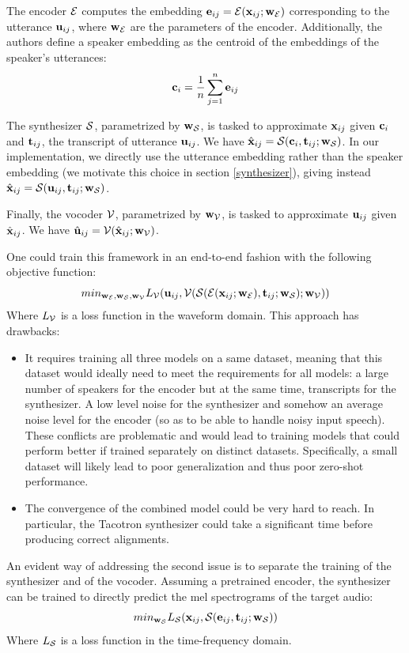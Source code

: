 \documentclass[a4paper, oneside, 12pt, english]{article}
\begin{document}
The encoder $\mathcal{E}$ computes the embedding $\mathbf{e}_{ij} = \mathcal{E}(\mathbf{x}_{ij}; \mathbf{w}_{\mathcal{E}})$ corresponding to the utterance $\mathbf{u}_{ij}$, where $\mathbf{w}_{\mathcal{E}}$ are the parameters of the encoder. Additionally, the authors define a speaker embedding as the centroid of the embeddings of the speaker's utterances:
\begin{equation}\label{speaker_embedding}
\mathbf{c}_i=\frac{1}{n}\sum_{j=1}^{n}\mathbf{e}_{ij}
\end{equation}

The synthesizer $\mathcal{S}$, parametrized by $\mathbf{w}_{\mathcal{S}}$, is tasked to approximate $\mathbf{x}_{ij}$ given $\mathbf{c}_i$ and $\mathbf{t}_{ij}$, the transcript of utterance $\mathbf{u}_{ij}$. We have $\hat{\mathbf{x}}_{ij} = \mathcal{S}(\mathbf{c}_i, \mathbf{t}_{ij}; \mathbf{w}_{\mathcal{S}})$. In our implementation, we directly use the utterance embedding rather than the speaker embedding (we motivate this choice in section \ref{synthesizer}), giving instead $\hat{\mathbf{x}}_{ij} = \mathcal{S}(\mathbf{u}_{ij}, \mathbf{t}_{ij}; \mathbf{w}_{\mathcal{S}})$.

Finally, the vocoder $\mathcal{V}$, parametrized by $\mathbf{w}_{\mathcal{V}}$, is tasked to approximate $\mathbf{u}_{ij}$ given $\hat{\mathbf{x}}_{ij}$. We have $\hat{\mathbf{u}}_{ij} = \mathcal{V}(\hat{\mathbf{x}}_{ij}; \mathbf{w}_{\mathcal{V}})$.

One could train this framework in an end-to-end fashion with the following objective function:
$$ min_{\mathbf{w}_{\mathcal{E}}, \mathbf{w}_{\mathcal{S}}, \mathbf{w}_{\mathcal{V}}} L_{\mathcal{V}}(\mathbf{u}_{ij}, \mathcal{V}(\mathcal{S}(\mathcal{E}(\mathbf{x}_{ij}; \mathbf{w}_{\mathcal{E}}), \mathbf{t}_{ij}; \mathbf{w}_{\mathcal{S}}); \mathbf{w}_{\mathcal{V}})) $$
Where $L_{\mathcal{V}}$ is a loss function in the waveform domain. This approach has drawbacks:
\begin{itemize}
	\item It requires training all three models on a same dataset, meaning that this dataset would ideally need to meet the requirements for all models: a large number of speakers for the encoder but at the same time, transcripts for the synthesizer. A low level noise for the synthesizer and somehow an average noise level for the encoder (so as to be able to handle noisy input speech). These conflicts are problematic and would lead to training models that could perform better if trained separately on distinct datasets. Specifically, a small dataset will likely lead to poor generalization and thus poor zero-shot performance.
	\item The convergence of the combined model could be very hard to reach. In particular, the Tacotron synthesizer could take a significant time before producing correct alignments.
\end{itemize}

An evident way of addressing the second issue is to separate the training of the synthesizer and of the vocoder. Assuming a pretrained encoder, the synthesizer can be trained to directly predict the mel spectrograms of the target audio:
$$ min_{\mathbf{w}_{\mathcal{S}}} L_{\mathcal{S}}(\mathbf{x}_{ij}, \mathcal{S}(\mathbf{e}_{ij}, \mathbf{t}_{ij}; \mathbf{w}_{\mathcal{S}})) $$
Where $L_{\mathcal{S}}$ is a loss function in the time-frequency domain. 
\end{document}
